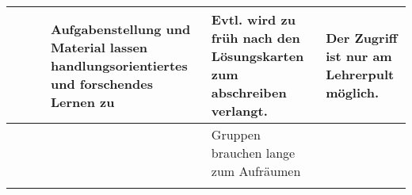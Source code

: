 \begin{longtable}{>{\small\raggedright}lYYYYY}
 & 
&
&
Aufgabenstellung und Material lassen handlungsorientiertes und forschendes Lernen zu & 
Evtl. wird zu früh nach den Lösungskarten zum abschreiben verlangt. &
Der Zugriff ist nur am Lehrerpult möglich. 
\\ \midrule%
%
%
&
&
&
& 
Gruppen brauchen lange zum Aufräumen & 

\\ \addlinespace[1ex]
\bottomrule
\end{longtable}
%
